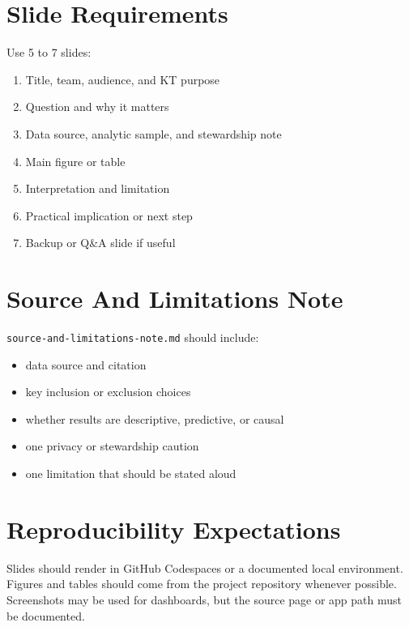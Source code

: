 \documentclass[
  letterpaper,
  DIV=11,
  numbers=noendperiod,
  oneside]{scrreprt}
\providecommand{\tightlist}{%
  \setlength{\itemsep}{0pt}\setlength{\parskip}{0pt}}
\begin{document}
\section{Slide Requirements}\label{slide-requirements}

Use 5 to 7 slides:

\begin{enumerate}
\def\labelenumi{\arabic{enumi}.}
\tightlist
\item
  Title, team, audience, and KT purpose
\item
  Question and why it matters
\item
  Data source, analytic sample, and stewardship note
\item
  Main figure or table
\item
  Interpretation and limitation
\item
  Practical implication or next step
\item
  Backup or Q\&A slide if useful
\end{enumerate}

\section{Source And Limitations Note}\label{source-and-limitations-note}

\texttt{source-and-limitations-note.md} should include:

\begin{itemize}
\tightlist
\item
  data source and citation
\item
  key inclusion or exclusion choices
\item
  whether results are descriptive, predictive, or causal
\item
  one privacy or stewardship caution
\item
  one limitation that should be stated aloud
\end{itemize}

\section{Reproducibility
Expectations}\label{reproducibility-expectations-7}

Slides should render in GitHub Codespaces or a documented local
environment. Figures and tables should come from the project repository
whenever possible. Screenshots may be used for dashboards, but the
source page or app path must be documented.
\end{document}
